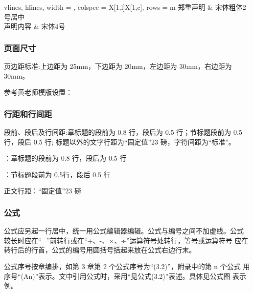 \begin{longtblr}[%
  caption = {本科模版：学术声明的字体和字号设置}
]{%
  vlines, hlines,
  width   = \textwidth,
  colspec = {X[1,l]X[1,c]},
  rows = {m}
}
  郑重声明    & 宋体粗体2号居中\\
  声明内容    & 宋体4号\\
\end{longtblr}


\subsubsection{页面尺寸}

\begin{reference}
  页边距标准:上边距为 25mm，下边距为 20mm，左边距为 30mm，右边距为 30mm。
\end{reference}

参考黄老师模版设置：
\begin{latexcode}
  \RequirePackage[top=2.7truecm,bottom=2.2truecm,left=3truecm,right=3truecm,includefoot,xetex]{geometry} 
\end{latexcode}


\subsubsection{行距和行间距}

\begin{reference}
  段前、段后及行间距:章标题的段前为 0.8 行，段后为 0.5 行；节标题段前为 0.5行，段后 0.5 行; 标题以外的文字行距为“固定值”23 磅，字符间距为“标准”。
\end{reference}

\begin{points}
  \item {}：章标题的段前为 0.8 行，段后为 0.5 行
  \item {}：节标题段前为 0.5行，段后 0.5 行
  \item 正文行距：“固定值”23 磅
\end{points}


\subsubsection{公式}

\begin{reference}
  公式应另起一行居中，统一用公式编辑器编辑。公式与编号之间不加虚线。公式 较长时应在“=”前转行或在“+、-、×、÷”运算符号处转行，等号或运算符号 应在转行后的行首，公式的编号用圆括号括起来放在公式右边行末。
  
  公式序号按章编排，如第 3 章第 2 个公式序号为“(3.2)”，附录中的第 n 个公式 用序号“(An)”表示。文中引用公式时，采用“见公式(3.2)”表述。具体见公式图 表示例。
\end{reference}

